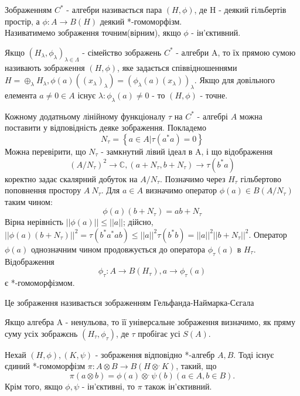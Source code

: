\begin{definition}
    Зображенням $C^*$ - алгебри називається пара $(H, \phi)$, де H - деякий гільбертів простір, а $\phi: A \to B(H)$ деякий *-гомоморфізм. \\
    Називатимемо зображення точним(вірним), якщо $\phi$ - ін'єктивний.

    Якщо $(H_{\lambda}, \phi_{\lambda})_{\lambda \in \Lambda}$ - сімейство зображень $C^*$ - алгебри A,
    то їх прямою сумою називають зображення $(H, \phi)$, яке задається співвідношеннями
    $H = \oplus_{\lambda} H_{\lambda}, \phi(a)((x_{\lambda})_{\lambda}) = (\phi_{\lambda}(a)(x_{\lambda}))_{\lambda}$.
    Якщо для довільного елемента $a \neq 0 \in A$ існує $\lambda: \phi_{\lambda}(a) \neq 0$ - то $(H, \phi)$ - точне.
\end{definition}
Кожному додатньому лінійному функціоналу $\tau$ на $C^*$ - алгебрі $A$ можна поставити у відповідність деяке зображення.
Покладемо
\begin{equation*}
    N_{\tau} = \left\{ a \in A | \tau(a^* a) = 0 \right\}
\end{equation*}
Можна перевірити, що $N_\tau$ - замкнутий лівий ідеал в A, і що відображення
\begin{equation*}
    (A / N_\tau)^2 \to \mathbb{C}, (a + N_\tau, b + N_\tau) \to \tau(b^* a)
\end{equation*}
коректно задає скалярний добуток на $A / N_\tau$.
Позначимо через $H_\tau$ гільбертово поповнення простору $A \ N_\tau$.
Для $a \in A$ визначимо оператор $\phi(a) \in B(A / N_\tau)$ таким чином:
\begin{equation*}
    \phi(a)(b + N_\tau) = ab + N_\tau
\end{equation*}
Вірна нерівність $||\phi(a)|| \leq ||a||$; дійсно, $||\phi(a)(b+ N_\tau)||^2 = \tau(b^*a^*ab) \leq ||a||^2 \tau(b^* b) = ||a||^2 ||b + N_\tau||^2$.
Оператор $\phi(a)$ однозначним чином продовжується до оператора $\phi_\tau(a)$ в $H_\tau$.
Відображення
\begin{equation*}
    \phi_\tau: A \to B(H_\tau), a \to \phi_\tau(a)
\end{equation*}
є *-гомоморфізмом.

Це зображення називається зображенням Гельфанда-Наймарка-Сєгала

Якщо алгебра A - ненульова, то її універсальне зображення визначимо, як пряму суму усіх зображєнь $(H_\tau, \phi_\tau)$,
де $\tau$ пробігає усі $S(A)$.

\begin{theorem}
    Нехай $(H,\phi),(K, \psi)$ - зображення відповідно *-алгебр $A,B$.
    Тоді існує єдиний *-гомоморфізм $\pi: A \otimes B \to B(H \otimes^. K)$, такий, що
    \begin{equation*}
        \pi(a \otimes b) = \phi(a) \otimes^. \psi(b) (a \in A, b \in B).
    \end{equation*}
    Крім того, якщо $\phi, \psi$ - ін'єктивні, то $\pi$ також ін'єктивний.
\end{theorem}

